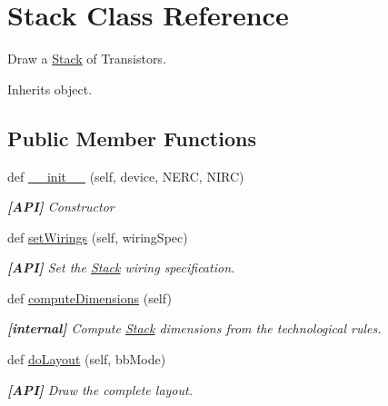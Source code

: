 \hypertarget{classpython_1_1Stack_1_1Stack}{}\section{Stack Class Reference}
\label{classpython_1_1Stack_1_1Stack}


Draw a \mbox{\hyperlink{classpython_1_1Stack_1_1Stack}{Stack}} of Transistors.  




Inherits object.

\subsection*{Public Member Functions}
\begin{DoxyCompactItemize}
\item 
def \mbox{\hyperlink{classpython_1_1Stack_1_1Stack_a818e80b2a75b3e0d06f9826d1c60ecab}{\+\_\+\+\_\+init\+\_\+\+\_\+}} (self, device, N\+E\+RC, N\+I\+RC)
\begin{DoxyCompactList}\small\item\em {\bfseries \mbox{[}A\+PI\mbox{]}} Constructor \end{DoxyCompactList}\item 
def \mbox{\hyperlink{classpython_1_1Stack_1_1Stack_a4fa5741d1869983366b4ca96c3ae85b5}{set\+Wirings}} (self, wiring\+Spec)
\begin{DoxyCompactList}\small\item\em {\bfseries \mbox{[}A\+PI\mbox{]}} Set the \mbox{\hyperlink{classpython_1_1Stack_1_1Stack}{Stack}} wiring specification. \end{DoxyCompactList}\item 
def \mbox{\hyperlink{classpython_1_1Stack_1_1Stack_a74ff17e974efecc28c792db05b5d3eb0}{compute\+Dimensions}} (self)
\begin{DoxyCompactList}\small\item\em {\bfseries \mbox{[}internal\mbox{]}} Compute \mbox{\hyperlink{classpython_1_1Stack_1_1Stack}{Stack}} dimensions from the technological rules. \end{DoxyCompactList}\item 
def \mbox{\hyperlink{classpython_1_1Stack_1_1Stack_a2b936db85a32775dd3739ccfdfef636d}{do\+Layout}} (self, bb\+Mode)
\begin{DoxyCompactList}\small\item\em {\bfseries \mbox{[}A\+PI\mbox{]}} Draw the complete layout. \end{DoxyCompactList}\end{DoxyCompactItemize}


